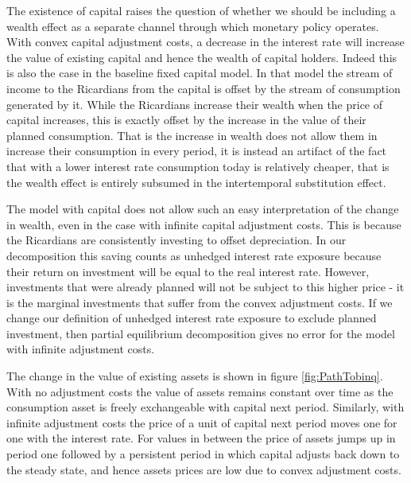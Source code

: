 \documentclass[titlepage]{\econtex}\newcommand{\texname}{ConsumptionHeterogeneity}
\begin{document}
The existence of capital raises the question of whether we should be including a wealth effect as a separate channel through which monetary policy operates. With convex capital adjustment costs, a decrease in the interest rate will increase the value of existing capital and hence the wealth of capital holders. Indeed this is also the case in the baseline fixed capital model. In that model the stream of income to the Ricardians from the capital is  offset by the stream of consumption generated by it. While the Ricardians increase their wealth when the price of capital increases, this is exactly offset by the increase in the value of their planned consumption. That is the increase in wealth does not allow them in increase their consumption in every period, it is instead an artifact of the fact that with a lower interest rate consumption today is relatively cheaper, that is the wealth effect is entirely subsumed in the intertemporal substitution effect.

The model with capital does not allow such an easy interpretation of the change in wealth, even in the case with infinite capital adjustment costs. This is because the Ricardians are consistently investing to offset depreciation. In our decomposition this saving counts as unhedged interest rate exposure because their return on investment will be equal to the real interest rate. However, investments that were already planned will not be subject to this higher price - it is the marginal investments that suffer from the convex adjustment costs. If we change our definition of unhedged interest rate exposure to exclude planned investment, then partial equilibrium decomposition gives no error for the model with infinite adjustment costs.



The change in the value of existing assets is shown in figure \ref{fig:PathTobinq}. With no adjustment costs the value of assets remains constant over time as the consumption asset is freely exchangeable with capital next period. Similarly, with infinite adjustment costs the price of a unit of capital next period moves one for one with the interest rate. For values in between the price of assets jumps up in period one followed by a persistent period in which capital adjusts back down to the steady state, and hence assets prices are low due to convex adjustment costs.
\end{document}
